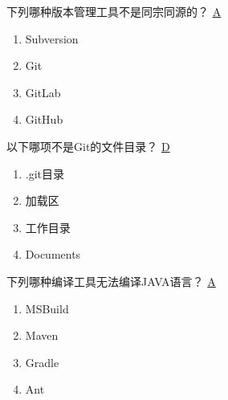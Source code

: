 \begin{problem}
	下列哪种版本管理工具不是同宗同源的？
	\uline{A}    
    \vspace{-0.8em}
    \begin{multicols}{4}
        \begin{enumerate}[label=\Alph*.]
            \item Subversion
            \item Git
            \item GitLab
            \item GitHub
        \end{enumerate}
    \end{multicols}
    \vspace{-1em}
\end{problem}


\begin{problem}
	以下哪项不是Git的文件目录？
	\uline{D}    
    \vspace{-0.8em}
    \begin{multicols}{4}
        \begin{enumerate}[label=\Alph*.]
            \item .git目录
            \item 加载区
            \item 工作目录
            \item Documents
        \end{enumerate}
    \end{multicols}
    \vspace{-1em}
\end{problem}


\begin{problem}
	下列哪种编译工具无法编译JAVA语言？
	\uline{A}    
    \vspace{-0.8em}
    \begin{multicols}{4}
        \begin{enumerate}[label=\Alph*.]
            \item MSBuild
            \item Maven
            \item Gradle
            \item Ant
        \end{enumerate}
    \end{multicols}
    \vspace{-1em}
\end{problem}


